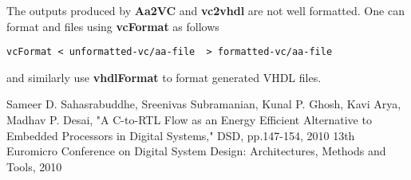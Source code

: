 The outputs produced by {\bf Aa2VC} and {\bf vc2vhdl} are
not well formatted.  One can format \Aa and \vC files
using  {\bf vcFormat} as follows
\begin{verbatim}
vcFormat < unformatted-vc/aa-file  > formatted-vc/aa-file
\end{verbatim}
and similarly use {\bf vhdlFormat} to format generated
VHDL files.


\begin{thebibliography}{99}
Sameer D. Sahasrabuddhe, Sreenivas Subramanian, Kunal P. Ghosh, Kavi Arya, Madhav P. Desai, 
"A C-to-RTL Flow as an Energy Efficient Alternative to Embedded Processors in Digital Systems," 
DSD, pp.147-154, 2010 13th Euromicro Conference on Digital 
System Design: Architectures, Methods and Tools, 2010
\end{thebibliography}

